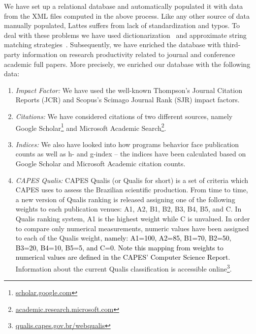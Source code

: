 \documentclass[10pt]{article}
\newcommand{\luciano}[1]{\textcolor{black}{#1}}
\begin{document}
We have set up a relational database and automatically populated it with data from the XML files computed in the above
process. Like any other source of data manually populated, Lattes suffers from lack of standardization and typos. To deal
with these problems we have used dictionarization~\cite{okazaki2010} and approximate string matching strategies~\cite{cohen2003}.
Subsequently, we have enriched the database with third-party information on research productivity related to journal and
conference academic full papers. More precisely, we enriched our database with the following data:

\begin{enumerate}

        \item {\em Impact Factor:} We have used the well-known Thompson's Journal Citation Reports
		(JCR) 
		and Scopus's Scimago Journal Rank
            	(SJR) 
		impact factors. 

        \item {\em Citations:} We have considered citations of two different sources, namely Google
            Scholar\footnote{\url{scholar.google.com}} and Microsoft Academic Search\footnote{\url{academic.research.microsoft.com}}.

        \item {\em Indices:} We also have looked into how programs behavior face publication counts as well as  h- and g-index --
            the indices have been calculated based on Google Scholar and Microsoft Academic citation counts.
        
        \item{\em CAPES Qualis:} CAPES Qualis (or Qualis for short) is a set of criteria which CAPES uses to assess the
            Brazilian scientific production. From time to time, a new version of Qualis ranking is released assigning one of
            the following weights to each publication venues: A1, A2, B1, B2, B3, B4, B5, and C. In Qualis ranking system, A1
            is the highest weight while C is unvalued.  In order to compare only numerical measurements, numeric values have been assigned to each of the Qualis weight, \luciano{namely: A1=100, A2=85, B1=70, B2=50, B3=20, B4=10, B5=5, and C=0. Note this mapping from weights to numerical values are defined in the CAPES’ Computer Science Report.} Information about the current Qualis classification is accessible online\footnote{\url{qualis.capes.gov.br/webqualis}}. 


\end{enumerate}
\end{document}
